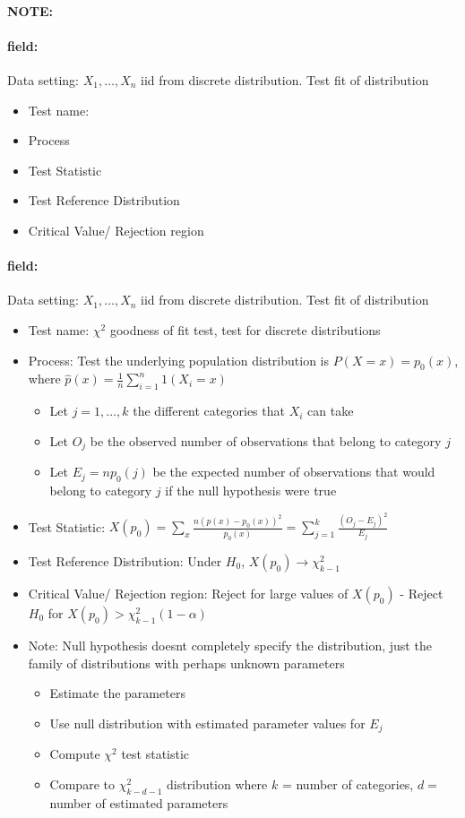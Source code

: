 \documentclass[12pt]{article}
\newenvironment{note}{\paragraph{NOTE:}}{}
\newenvironment{field}{\paragraph{field:}}{}
\begin{document}
\begin{note}
 \begin{field}
  Data setting: $X_1, \ldots , X_n$ iid from discrete distribution. Test fit of distribution
  \begin{itemize}
   \item Test name:
   \item Process
   \item Test Statistic
   \item Test Reference Distribution
   \item Critical Value/ Rejection region
  \end{itemize}
 \end{field}
 \begin{field}
  Data setting: $X_1, \ldots , X_n$ iid from discrete distribution. Test fit of distribution
  \begin{itemize}
   \item Test name: $\chi^2$ goodness of fit test, test for discrete distributions
   \item Process: Test the underlying population distribution is $P(X = x) = p_0(x)$, where $\hat{p}(x) = \frac{1}{n} \sum_{i=1}^n 1(X_i = x)$
         \begin{itemize}
          \item Let $j = 1, \ldots, k$ the different categories that $X_i$ can take
          \item Let $O_j$ be the observed number of observations that belong to category $j$
          \item Let $E_j = np_0(j)$ be the expected number of observations that would belong to category $j$ if the null hypothesis were true
         \end{itemize}
   \item Test Statistic: $X(p_0) = \sum_x\frac{n(\hat{p}(x) - p_0(x))^2}{p_0(x)} = \sum_{j=1}^k \frac{(O_j - E_j)^2}{E_j}$
   \item Test Reference Distribution: Under $H_0$, $X(p_0) \to \chi_{k-1}^2$
   \item Critical Value/ Rejection region: Reject for large values of $X(p_0)$ - Reject $H_0$ for $X(p_0) > \chi_{k-1}^2(1-\alpha)$
   \item Note: Null hypothesis doesnt completely specify the distribution, just the family of distributions with perhaps unknown parameters
         \begin{itemize}
          \item Estimate the parameters
          \item Use null distribution with estimated parameter values for $E_j$
          \item Compute $\chi^2$ test statistic
          \item Compare to $\chi_{k-d-1}^2$ distribution where $k$ = number of categories, $d = $ number of estimated parameters
         \end{itemize}
  \end{itemize}
 \end{field}
\end{note}
\end{document}
